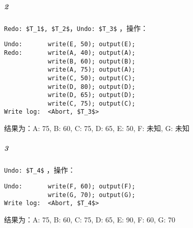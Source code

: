 \documentclass{article}
\begin{document}
    \subparagraph{\textcircled{2}}
    \lstinline[style = transaction]{Redo: $T_1$, $T_2$}，\lstinline[style = transaction]{Undo: $T_3$}
，操作：
\begin{lstlisting}[style = transaction]
Undo:       write(E, 50); output(E);
Redo:       write(A, 40); output(A);
            write(B, 60); output(B);
            write(A, 75); output(A);
            write(C, 50); output(C);
            write(D, 80); output(D);
            write(D, 65); output(D);
            write(C, 75); output(C);
Write log:  <Abort, $T_3$>
\end{lstlisting}
结果为：A: 75, B: 60, C: 75, D: 65, E: 50, F: 未知, G: 未知

\subparagraph{\textcircled{3}}
\lstinline[style = transaction]{Undo: $T_4$}
，操作：
\begin{lstlisting}[style = transaction]
Undo:       write(F, 60); output(F);
            write(G, 70); output(G);
Write log:  <Abort, $T_4$>
\end{lstlisting}
结果为：A: 75, B: 60, C: 75, D: 65, E: 90, F: 60, G: 70
\end{document}
